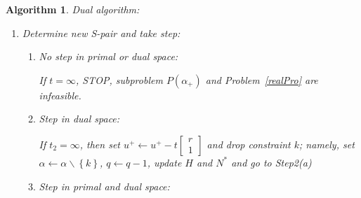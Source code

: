 \documentclass{article}
\newtheorem{algorithm}{Algorithm}
\begin{document}
\begin{algorithm}{Dual algorithm:}
\begin{enumerate}
\begin{enumerate}
				\begin{enumerate}
					\item Dual step length $t_{1}$; (maximum step in the dual space without violating dual feasibility).
					\begin{align*}
						t_{1} \leftarrow \min\left\lbrace\min_{\substack{j \in\alpha\\
								r_{j}<0}}\left\lbrace \frac{u_{j}^{+}}{r_{j}}\right\rbrace, \infty\right\rbrace,
					\end{align*}
					\item Primal step length $t_{2}$; (minimum step in primal space such that the $p$th constraint becomes feasible).
					\begin{align*}
						t_{2}\leftarrow\left\lbrace\begin{aligned}
							&\infty, &\text{if }d^{T}n^{+} \geq 0,\\
							&-\frac{s_{p}(z)}{d^{T}n^{+}}, &\text{otherwise}.
						\end{aligned}\right.
					\end{align*}
					\item Step length $t$:
					\begin{align*}
						t \leftarrow\min\left\lbrace t_{1}, t_{2}\right\rbrace.
					\end{align*}
				\end{enumerate}
				\item Determine new S-pair and take step:
				\begin{enumerate}
					\item No step in primal or dual space:
					
					If $t = \infty$, STOP, subproblem $P(\alpha_{+})$ and Problem~\eqref{realPro} are infeasible.
					
					\item Step in dual space:
					
					If $t_{2} = \infty$, then set $u^{+} \leftarrow u^{+} - t \begin{bmatrix}
						r\\
						1
					\end{bmatrix}$ and drop constraint $k$; namely, set $\alpha \leftarrow \alpha\backslash\left\lbrace k\right\rbrace$, $q \leftarrow q - 1$, update $H$ and $N^{\ast}$ and go to Step2(a)
					
					\item Step in primal and dual space:
				

\end{enumerate}
\end{enumerate}
\end{enumerate}
\end{algorithm}
\end{document}
